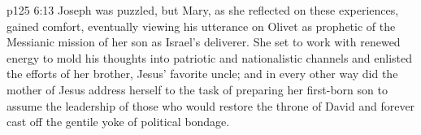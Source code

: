 \vs p125 6:13 \pc Joseph was puzzled, but Mary, as she reflected on these experiences, gained comfort, eventually viewing his utterance on Olivet as prophetic of the Messianic mission of her son as Israel’s deliverer. She set to work with renewed energy to mold his thoughts into patriotic and nationalistic channels and enlisted the efforts of her brother, Jesus’ favorite uncle; and in every other way did the mother of Jesus address herself to the task of preparing her first\hyp{}born son to assume the leadership of those who would restore the throne of David and forever cast off the gentile yoke of political bondage.
